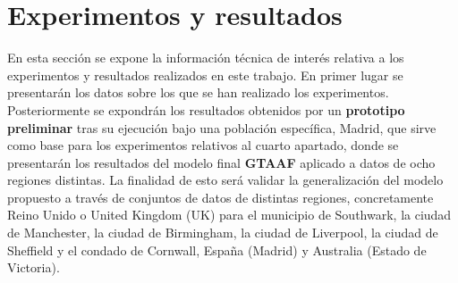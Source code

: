       
\chapter{Experimentos y resultados}

En esta sección se expone la información técnica de interés relativa a los experimentos y resultados realizados en este trabajo. En primer lugar se presentarán los datos sobre los que se han realizado los experimentos. Posteriormente se expondrán los resultados obtenidos por un \textbf{prototipo preliminar} tras su ejecución bajo una población específica, Madrid, que sirve como base para los experimentos relativos al cuarto apartado, donde se presentarán los resultados del modelo final \textbf{GTAAF} aplicado a datos de ocho regiones distintas. La finalidad de esto será validar la generalización del modelo propuesto a través de conjuntos de datos de distintas regiones, concretamente Reino Unido o United Kingdom (UK) para el municipio de Southwark, la ciudad de Manchester, la ciudad de Birmingham, la ciudad de Liverpool, la ciudad de Sheffield y el condado de Cornwall, España (Madrid) y Australia (Estado de Victoria).






	
